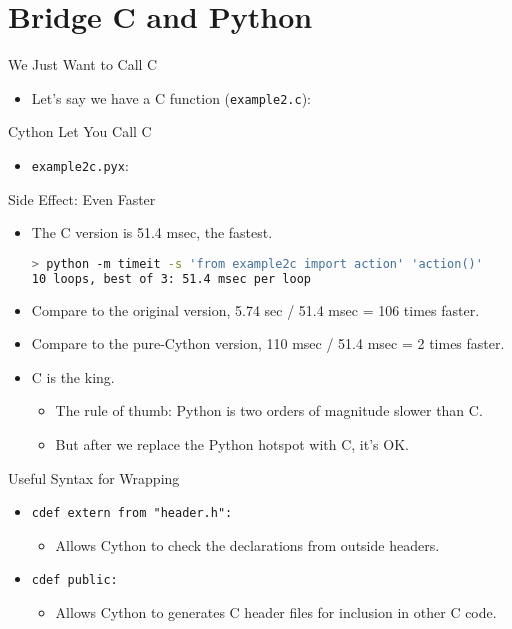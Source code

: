 \documentclass[dvips,xcolor=pst,14pt]{beamer}
\begin{document}
\section{
Bridge C and Python
}

\begin{frame}[fragile]{
%
We Just Want to Call C
%
}
\begin{itemize}
\item Let's say we have a C function ({\color{red}\verb+example2.c+}):

\end{itemize}
\end{frame}

\begin{frame}[fragile]{
%
Cython Let You Call C
%
}
\begin{itemize}
\item {\color{red}\verb+example2c.pyx+}:

\end{itemize}
\end{frame}

\begin{frame}[fragile]{
%
Side Effect: Even Faster
%
}
\begin{itemize}
\item The C version is 51.4 msec, the fastest.
\begin{lstlisting}[language=bash]
> python -m timeit -s 'from example2c import action' 'action()'
10 loops, best of 3: 51.4 msec per loop
\end{lstlisting}
\item Compare to the original version, 5.74 sec / 51.4 msec = 106 times faster.
\item Compare to the pure-Cython version, 110 msec / 51.4 msec = 2 times
faster. 
\item \alert{C is the king}.
\begin{itemize}
  \item The rule of thumb: Python is \alert{two orders of magnitude slower}
  than C.
  \item But after we replace the Python hotspot with C, it's OK.
\end{itemize}
\end{itemize}
\end{frame}

\begin{frame}[fragile]{
%
Useful Syntax for Wrapping
%
}
\begin{itemize}
\item \verb+cdef extern from "header.h":+
\begin{itemize}
  \item Allows Cython to check the declarations from outside headers.
\end{itemize}
\item \verb+cdef public:+
\begin{itemize}
  \item Allows Cython to generates C header files for inclusion in other C
  code.
\end{itemize}
\end{itemize}
\end{frame}
\end{document}
